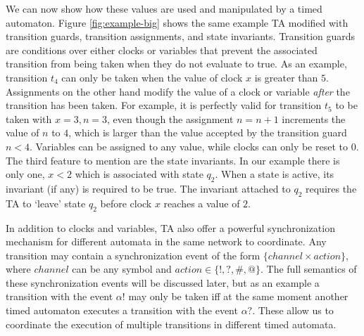 \documentclass[a4paper,12pt]{article}
\begin{document}
We can now show how these values are used and manipulated by a timed automaton.
Figure \ref{fig:example-big} shows the same example TA modified with transition
guards, transition assignments, and state invariants. Transition guards are
conditions over either clocks or variables that prevent the associated
transition from being taken when they do not evaluate to true. As an example,
transition $t_{4}$ can only be taken when the value of clock $x$ is greater than
$5$. Assignments on the other hand modify the value of a clock or variable
\emph{after} the transition has been taken. For example, it is perfectly valid
for transition $t_{5}$ to be taken with $x=3,n=3$, even though the assignment
$n=n+1$ increments the value of $n$ to $4$, which is larger than the value
accepted by the transition guard $n<4$. Variables can be assigned to any value,
while clocks can only be reset to $0$. The third feature to mention are the
state invariants. In our example there is only one, $x<2$ which is associated
with state $q_{2}$. When a state is active, its invariant (if any) is required
to be true. The invariant attached to $q_{2}$ requires the TA to `leave' state
$q_{2}$ before clock $x$ reaches a value of $2$.


In addition to clocks and variables, TA also offer a powerful synchronization
mechanism for different automata in the same network to coordinate. Any
transition may contain a synchronization event of the form
$\{channel \times action\}$, where $channel$ can be any symbol and
$action \in \{!,?,\#,@\}$. The full semantics of these synchronization events
will be discussed later, but as an example a transition with the event $\alpha!$
may only be taken iff at the same moment another timed automaton executes a
transition with the event $\alpha?$. These allow us to coordinate the execution
of multiple transitions in different timed automata.
\end{document}
